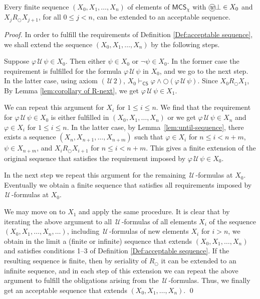 \documentclass[envcountsect,envcountsame,oribibl,orivec]{llncs}
\newcommand*\circled[1]{\tikz[baseline=(char.base)]{
		\node[shape=circle,draw,inner sep=0.4pt] (char) {#1};}}
\newcommand{\lnext}{\bigcirc}
\newcommand{\luntil}{{\,\mathcal{U}\,}}
\newcommand{\wprevious}{\circled{\textit{w}}}
\newcommand{\CS}{\textsf{CS}}
\renewcommand{\phi}{\varphi}
\newcommand{\MCS}{\mathsf{MCS}}
\begin{document}
\begin{lemma}\label{lem:finite seq to acceptable seq}
	Every finite sequence $(X_0, X_1, \ldots, X_n)$ of elements of\/ $\MCS_\chi$ with $\wprevious \bot \in X_0$ and $X_j R_\lnext X_{j+1}$, for all $0 \leq j < n$, can be extended to an  acceptable sequence.  
\end{lemma}
\begin{proof}
	In order to fulfill the requirements of Definition \ref{Def:acceptable sequence}, we shall extend the sequence $(X_0, X_1, \ldots, X_n)$ by the following steps.
	
	Suppose $\phi \luntil \psi \in X_0$. Then either $\psi \in X_0$ or $\neg\psi \in X_0$. In the former case the requirement is fulfilled for the formula $\phi \luntil \psi$  in $X_0$, and we go to the next step. In the latter case, using axiom $(\luntil 2)$, $X_0 \vdash_\CS \phi \wedge \lnext (\phi \luntil \psi)$. 
	Since $X_0 R_\lnext X_1$, By Lemma \ref{lem:corollary of R-next}, we get $\phi \luntil \psi \in X_1$. 
	
	
	We can repeat this argument for $X_i$ for 
	$1\leq i \leq n$. We find that the requirement for $\phi \luntil \psi \in X_0$ is either fulfilled in $(X_0, X_1, \ldots, X_n)$ or we get $\phi \luntil \psi \in X_n$ and  $\phi \in X_i$ for $1\leq i \leq n$. 
	In the latter case, by Lemma~\ref{lem:until-sequence}, there exists a sequence $(X_n, X_{n+1}, \ldots, X_{n+m})$
	such that 
	$\phi \in X_i$ for $n\leq i < n+m$,   
	$\psi \in X_{n+m}$, 
	and  $X_i R_\lnext X_{i+1}$ for $n\leq i < n+m$. This gives a finite extension of the original sequence that satisfies the requirement imposed by $\phi \luntil \psi \in X_0$.
	
	In the next step we repeat this argument for the remaining $\luntil$-formulas at $X_0$. Eventually we obtain a finite sequence that satisfies all requirements imposed by $\luntil$-formulas at $X_0$.
	
	We may move on to $X_1$ and apply the same procedure. 
	It is clear that by iterating the above argument to all $\luntil$-formulas of all elements $X_i$ of the sequence $(X_0, X_1, \ldots, X_n,\ldots)$, including $\luntil$-formulas of new elements $X_i$ for $i > n$, we obtain in the limit a (finite or infinite) sequence that extends $(X_0, X_1, \ldots, X_n)$ and satisfies conditions 1--3 of Definition \ref{Def:acceptable sequence}. If the resulting sequence is finite, then by seriality of  $R_\lnext$ it can be extended to an infinite sequence, and in each step of this extension we can repeat the above argument to fulfill the obligations arising from the $\luntil$-formulas.  	 
	Thus, we finally get an acceptable sequence that extends $(X_0, X_1, \ldots, X_n)$. \qed
\end{proof}
\end{document}

